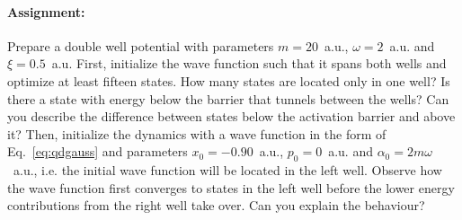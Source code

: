 \paragraph{Assignment:} Prepare a double well potential with parameters $m=20$~a.u., $\omega=2$~a.u. and $\xi=0.5$~a.u. First, initialize the wave function such that it spans both wells and optimize at least fifteen states. 
How many states are located only in one well? Is there a state with energy below the barrier that tunnels between the wells? Can you describe the difference between states below the activation barrier and above it?
Then, initialize the dynamics with a wave function in the form of Eq.~\eqref{eq:qdgauss} and parameters $x_0=-0.90$~a.u., $p_0=0$~a.u. and $\alpha_0 = 2m\omega$~a.u., i.e. the initial wave function will be located in the left well. Observe how the wave function first converges to states in the left well before the lower energy contributions from the right well take over. Can you explain the behaviour?







